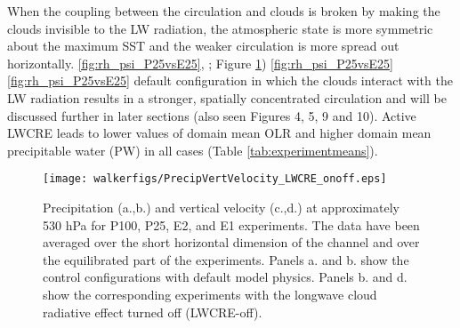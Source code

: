\documentclass[draft]{agujournal2019}
\begin{document}
When the coupling between the circulation and clouds is broken by making the clouds invisible to the 
LW radiation, the atmospheric state is more symmetric about the maximum SST and the weaker circulation
is more spread out horizontally.   
\ref{fig:rh_psi_P25vsE25}, 
; Figure \ref{fig:precip_vertvel})
\ref{fig:rh_psi_P25vsE25} 
\ref{fig:rh_psi_P25vsE25} 
 default configuration in which the clouds interact with the LW radiation results in a stronger,
spatially concentrated circulation and will be discussed further in later sections (also seen Figures 4, 5, 9 and 10).
Active LWCRE leads to lower values of domain mean OLR and higher domain mean precipitable water (PW) in all cases (Table \ref{tab:experimentmeans}). 

\begin{figure}
  \centering
      \texttt{[image: walkerfigs/PrecipVertVelocity\_LWCRE\_onoff.eps]}
  \caption{Precipitation (a.,b.) and vertical velocity (c.,d.) at approximately 530 hPa for P100, P25, E2, and E1 experiments.  
  The data have been averaged over the short horizontal dimension of the channel and over the 
  equilibrated part of the experiments.  Panels a. and b. show the control configurations with default model physics. 
  Panels b. and d. show the corresponding experiments with the longwave cloud radiative effect turned
  off (LWCRE-off).}
  \label{fig:precip_vertvel}
\end{figure}
\end{document}
